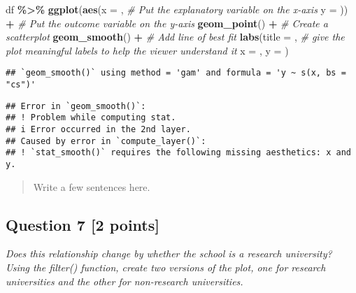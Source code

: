 \documentclass[
]{article}
\newenvironment{Shaded}{\begin{snugshade}}{\end{snugshade}}
\newcommand{\AttributeTok}[1]{\textcolor[rgb]{0.13,0.29,0.53}{#1}}
\newcommand{\CommentTok}[1]{\textcolor[rgb]{0.56,0.35,0.01}{\textit{#1}}}
\newcommand{\FunctionTok}[1]{\textcolor[rgb]{0.13,0.29,0.53}{\textbf{#1}}}
\newcommand{\NormalTok}[1]{#1}
\newcommand{\SpecialCharTok}[1]{\textcolor[rgb]{0.81,0.36,0.00}{\textbf{#1}}}
\newcommand{\StringTok}[1]{\textcolor[rgb]{0.31,0.60,0.02}{#1}}
\begin{document}
\begin{Shaded}
\begin{Highlighting}[]
\NormalTok{df }\SpecialCharTok{\%\textgreater{}\%}
  \FunctionTok{ggplot}\NormalTok{(}\FunctionTok{aes}\NormalTok{(}\AttributeTok{x =}\NormalTok{ , }\CommentTok{\# Put the explanatory variable on the x{-}axis}
             \AttributeTok{y =}\NormalTok{ )) }\SpecialCharTok{+}  \CommentTok{\# Put the outcome variable on the y{-}axis}
  \FunctionTok{geom\_point}\NormalTok{() }\SpecialCharTok{+} \CommentTok{\# Create a scatterplot}
  \FunctionTok{geom\_smooth}\NormalTok{() }\SpecialCharTok{+} \CommentTok{\# Add line of best fit}
  \FunctionTok{labs}\NormalTok{(}\AttributeTok{title =} \StringTok{\textquotesingle{}\textquotesingle{}}\NormalTok{, }\CommentTok{\# give the plot meaningful labels to help the viewer understand it}
       \AttributeTok{x =} \StringTok{\textquotesingle{}\textquotesingle{}}\NormalTok{,}
       \AttributeTok{y =} \StringTok{\textquotesingle{}\textquotesingle{}}\NormalTok{)}
\end{Highlighting}
\end{Shaded}

\begin{verbatim}
## `geom_smooth()` using method = 'gam' and formula = 'y ~ s(x, bs = "cs")'
\end{verbatim}

\begin{verbatim}
## Error in `geom_smooth()`:
## ! Problem while computing stat.
## i Error occurred in the 2nd layer.
## Caused by error in `compute_layer()`:
## ! `stat_smooth()` requires the following missing aesthetics: x and y.
\end{verbatim}

\begin{quote}
Write a few sentences here.
\end{quote}

\subsection{Question 7 {[}2 points{]}}\label{question-7-2-points}

\emph{Does this relationship change by whether the school is a research
university? Using the filter() function, create two versions of the
plot, one for research universities and the other for non-research
universities.}
\end{document}
